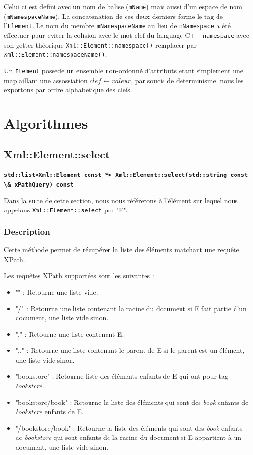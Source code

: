         Celui ci est defini avec un nom de balise (\lstinline$mName$) mais aussi d'un espace de nom (\lstinline$mNamespaceName$). La concatenation de ces deux derniers forme le tag de l'\lstinline$Element$. Le nom du membre \lstinline$mNamespaceName$ au lieu de \lstinline$mNamespace$ a \'et\'e effectuer pour eviter la colision avec le mot clef du language C++ \lstinline$namespace$ avec son getter th\'eorique \lstinline$Xml::Element::namespace()$ remplacer par \lstinline$Xml::Element::namespaceName()$.

        Un \lstinline$Element$ possede un ensemble non-ordonné d'attributs etant simplement une map aillant une assossiation $clef \leftarrow valeur$, par soucis de determinisme, nous les exportons par ordre alphabetique des clefs.

    \section{Algorithmes}

    \subsection{Xml::Element::select}

    \textbf{\lstinline$std::list<Xml::Element const *> Xml::Element::select(std::string const \& xPathQuery) const$}

    Dans la suite de cette section, nous nous référerons à l'élément sur lequel nous appelons \lstinline$Xml::Element::select$ par "E".

    \subsubsection{Description}
    Cette méthode permet de récupérer la liste des éléments matchant une requête XPath.

    Les requêtes XPath supportées sont les suivantes :
    \begin{itemize}
        \item "" : Retourne une liste vide.
        \item "/" : Retourne une liste contenant la racine du document si E fait partie d'un document, une liste vide sinon.
        \item "." : Retourne une liste contenant E.
        \item ".." : Retourne une liste contenant le parent de E si le parent est un élément, une liste vide sinon.
        \item "bookstore" : Retourne liste des éléments enfants de E qui ont pour tag \textit{bookstore}.
        \item "bookstore/book" : Retourne la liste des éléments qui sont des \textit{book} enfants de \textit{bookstore} enfants de E.
        \item "/bookstore/book" : Retourne la liste des éléments qui sont des \textit{book} enfants de \textit{bookstore} qui sont enfants de la racine du document si E appartient à un document, une liste vide sinon.
    \end{itemize}

